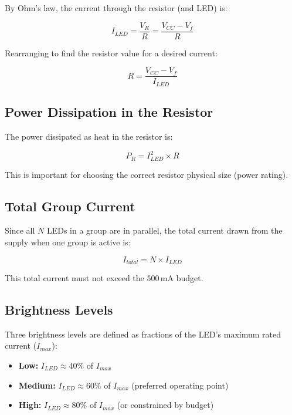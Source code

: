 \documentclass[12pt,letterpaper]{article}
\begin{document}
By Ohm's law, the current through the resistor (and LED) is:

\begin{equation}
  I_{LED} = \frac{V_R}{R} = \frac{V_{CC} - V_f}{R}
  \label{eq:iled}
\end{equation}

Rearranging to find the resistor value for a desired current:

\begin{equation}
  R = \frac{V_{CC} - V_f}{I_{LED}}
  \label{eq:r}
\end{equation}

\subsection{Power Dissipation in the Resistor}

The power dissipated as heat in the resistor is:

\begin{equation}
  P_R = I_{LED}^2 \times R
  \label{eq:pr}
\end{equation}

This is important for choosing the correct resistor physical size (power rating).

\subsection{Total Group Current}

Since all $N$ LEDs in a group are in parallel, the total current drawn from the supply
when one group is active is:

\begin{equation}
  I_{total} = N \times I_{LED}
  \label{eq:itotal}
\end{equation}

This total current must not exceed the 500\,mA budget.

\subsection{Brightness Levels}

Three brightness levels are defined as fractions of the LED's maximum rated current
($I_{max}$):

\begin{itemize}[leftmargin=2em]
  \item \textbf{Low:} $I_{LED} \approx 40\%$ of $I_{max}$
  \item \textbf{Medium:} $I_{LED} \approx 60\%$ of $I_{max}$ (preferred operating point)
  \item \textbf{High:} $I_{LED} \approx 80\%$ of $I_{max}$ (or constrained by budget)
\end{itemize}
\end{document}
